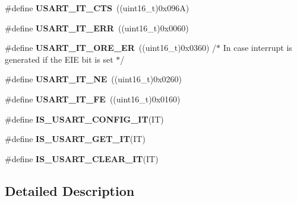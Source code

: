 \begin{DoxyCompactItemize}
\item 
\hypertarget{group___u_s_a_r_t___interrupt__definition_gab49efbefaca2921e8cbe8f5146e99dbd}{\#define {\bfseries U\-S\-A\-R\-T\-\_\-\-I\-T\-\_\-\-C\-T\-S}~((uint16\-\_\-t)0x096\-A)}\label{group___u_s_a_r_t___interrupt__definition_gab49efbefaca2921e8cbe8f5146e99dbd}

\item 
\hypertarget{group___u_s_a_r_t___interrupt__definition_ga631e83efd4c4789128d80a9539faf78a}{\#define {\bfseries U\-S\-A\-R\-T\-\_\-\-I\-T\-\_\-\-E\-R\-R}~((uint16\-\_\-t)0x0060)}\label{group___u_s_a_r_t___interrupt__definition_ga631e83efd4c4789128d80a9539faf78a}

\item 
\hypertarget{group___u_s_a_r_t___interrupt__definition_ga1faa2d618b7c1038f8cad50fec7d0ba4}{\#define {\bfseries U\-S\-A\-R\-T\-\_\-\-I\-T\-\_\-\-O\-R\-E\-\_\-\-E\-R}~((uint16\-\_\-t)0x0360) /$\ast$ In case interrupt is generated if the E\-I\-E bit is set $\ast$/}\label{group___u_s_a_r_t___interrupt__definition_ga1faa2d618b7c1038f8cad50fec7d0ba4}

\item 
\hypertarget{group___u_s_a_r_t___interrupt__definition_gad5de042f579b50f1e8643009176486b3}{\#define {\bfseries U\-S\-A\-R\-T\-\_\-\-I\-T\-\_\-\-N\-E}~((uint16\-\_\-t)0x0260)}\label{group___u_s_a_r_t___interrupt__definition_gad5de042f579b50f1e8643009176486b3}

\item 
\hypertarget{group___u_s_a_r_t___interrupt__definition_ga9af8790f78f6cb1591506c57d0cc0fb3}{\#define {\bfseries U\-S\-A\-R\-T\-\_\-\-I\-T\-\_\-\-F\-E}~((uint16\-\_\-t)0x0160)}\label{group___u_s_a_r_t___interrupt__definition_ga9af8790f78f6cb1591506c57d0cc0fb3}

\item 
\#define {\bfseries I\-S\-\_\-\-U\-S\-A\-R\-T\-\_\-\-C\-O\-N\-F\-I\-G\-\_\-\-I\-T}(I\-T)
\item 
\#define {\bfseries I\-S\-\_\-\-U\-S\-A\-R\-T\-\_\-\-G\-E\-T\-\_\-\-I\-T}(I\-T)
\item 
\#define {\bfseries I\-S\-\_\-\-U\-S\-A\-R\-T\-\_\-\-C\-L\-E\-A\-R\-\_\-\-I\-T}(I\-T)
\end{DoxyCompactItemize}


\subsection{Detailed Description}


